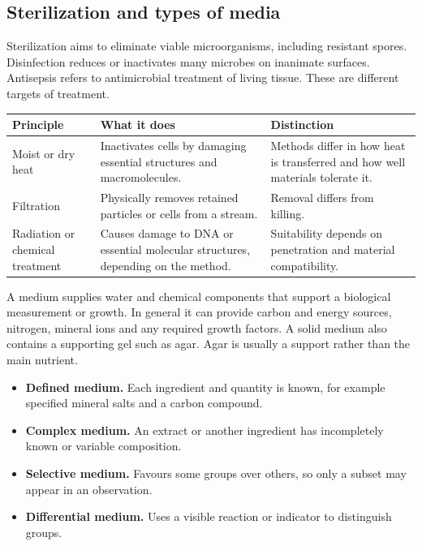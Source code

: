 \documentclass[12pt,a4paper]{article}
\begin{document}
\subsection{Sterilization and types of media}
\begin{tcolorbox}[defbox, title={Sterilization}]
Sterilization aims to eliminate viable microorganisms, including resistant spores. Disinfection reduces or inactivates many microbes on inanimate surfaces. Antisepsis refers to antimicrobial treatment of living tissue. These are different targets of treatment.
\end{tcolorbox}

\par\vspace{5pt}
\begingroup
\setlength{\extrarowheight}{1pt}
\noindent\begin{tabularx}{\linewidth}{|B{3.45cm}|Y|Y|}
\hline
\textbf{Principle} & \textbf{What it does} & \textbf{Distinction} \\ \hline
Moist or dry heat & Inactivates cells by damaging essential structures and macromolecules. & Methods differ in how heat is transferred and how well materials tolerate it. \\ \hline
Filtration & Physically removes retained particles or cells from a stream. & Removal differs from killing. \\ \hline
Radiation or chemical treatment & Causes damage to DNA or essential molecular structures, depending on the method. & Suitability depends on penetration and material compatibility. \\ \hline
\end{tabularx}\par
\endgroup
\begin{tcolorbox}[defbox, title={Growth medium}]
A medium supplies water and chemical components that support a biological measurement or growth. In general it can provide carbon and energy sources, nitrogen, mineral ions and any required growth factors. A solid medium also contains a supporting gel such as agar. Agar is usually a support rather than the main nutrient.
\end{tcolorbox}

\begin{itemize}[leftmargin=*, itemsep=2pt]
  \item \textbf{Defined medium.} Each ingredient and quantity is known, for example specified mineral salts and a carbon compound.
  \item \textbf{Complex medium.} An extract or another ingredient has incompletely known or variable composition.
  \item \textbf{Selective medium.} Favours some groups over others, so only a subset may appear in an observation.
  \item \textbf{Differential medium.} Uses a visible reaction or indicator to distinguish groups.
\end{itemize}
\end{document}
